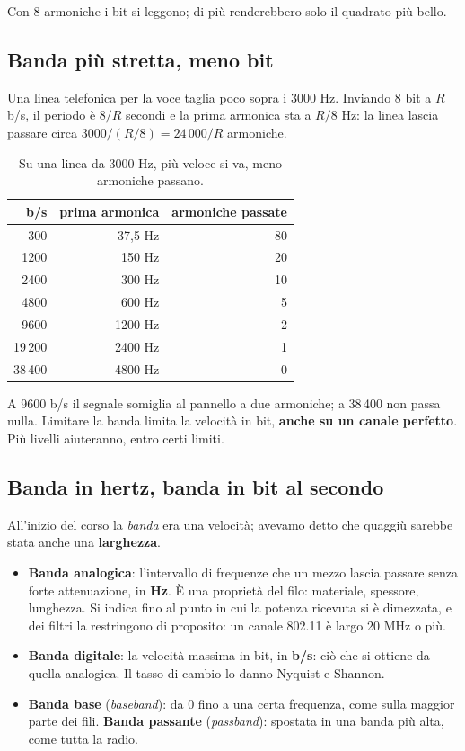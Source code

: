 Con 8 armoniche i bit si leggono; di più renderebbero solo il quadrato più bello.

\subsection{Banda più stretta, meno bit}

Una linea telefonica per la voce taglia poco sopra i 3000 Hz. Inviando 8 bit a $R$ b/s, il periodo è $8/R$ secondi e la prima
armonica sta a $R/8$ Hz: la linea lascia passare circa $3000/(R/8) = 24\,000/R$ armoniche.

\begin{table}[H]
\centering
\begin{tabular}{rrr}
\toprule
\textbf{b/s} & \textbf{prima armonica} & \textbf{armoniche passate} \\
\midrule
300 & 37,5 Hz & 80 \\
1200 & 150 Hz & 20 \\
2400 & 300 Hz & 10 \\
4800 & 600 Hz & 5 \\
9600 & 1200 Hz & 2 \\
19\,200 & 2400 Hz & 1 \\
38\,400 & 4800 Hz & 0 \\
\bottomrule
\end{tabular}
\caption{Su una linea da 3000 Hz, più veloce si va, meno armoniche passano.}
\end{table}

A 9600 b/s il segnale somiglia al pannello a due armoniche; a 38\,400 non passa nulla. Limitare la banda limita la velocità in bit,
\textbf{anche su un canale perfetto}. Più livelli aiuteranno, entro certi limiti.

\subsection{Banda in hertz, banda in bit al secondo}

All'inizio del corso la \emph{banda} era una velocità; avevamo detto che quaggiù sarebbe stata anche una \textbf{larghezza}.

\begin{itemize}
    \item \textbf{Banda analogica}: l'intervallo di frequenze che un mezzo lascia passare senza forte attenuazione, in \textbf{Hz}. È una
          proprietà del filo: materiale, spessore, lunghezza. Si indica fino al punto in cui la potenza ricevuta si è dimezzata, e
          dei filtri la restringono di proposito: un canale 802.11 è largo 20 MHz o più.
    \item \textbf{Banda digitale}: la velocità massima in bit, in \textbf{b/s}: ciò che si ottiene da quella analogica. Il tasso di cambio
          lo danno Nyquist e Shannon.
    \item \textbf{Banda base} (\emph{baseband}): da 0 fino a una certa frequenza, come sulla maggior parte dei fili. \textbf{Banda
          passante} (\emph{passband}): spostata in una banda più alta, come tutta la radio.
\end{itemize}

